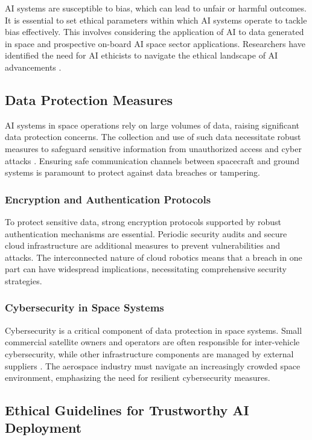 \documentclass[a4paper, 11pt]{article}
\begin{document}
AI systems are susceptible to bias, which can lead to unfair or harmful outcomes. It is essential to set ethical parameters within which AI systems operate to tackle bias effectively. This involves considering the application of AI to data generated in space and prospective on-board AI space sector applications. Researchers have identified the need for AI ethicists to navigate the ethical landscape of AI advancements \cite{328}.

\subsection{Data Protection Measures}

AI systems in space operations rely on large volumes of data, raising significant data protection concerns. The collection and use of such data necessitate robust measures to safeguard sensitive information from unauthorized access and cyber attacks \cite{15}. Ensuring safe communication channels between spacecraft and ground systems is paramount to protect against data breaches or tampering.

\subsubsection{Encryption and Authentication Protocols}

To protect sensitive data, strong encryption protocols supported by robust authentication mechanisms are essential. Periodic security audits and secure cloud infrastructure are additional measures to prevent vulnerabilities and attacks. The interconnected nature of cloud robotics means that a breach in one part can have widespread implications, necessitating comprehensive security strategies.

\subsubsection{Cybersecurity in Space Systems}

Cybersecurity is a critical component of data protection in space systems. Small commercial satellite owners and operators are often responsible for inter-vehicle cybersecurity, while other infrastructure components are managed by external suppliers \cite{275}. The aerospace industry must navigate an increasingly crowded space environment, emphasizing the need for resilient cybersecurity measures.

\subsection{Ethical Guidelines for Trustworthy AI Deployment}
\end{document}
